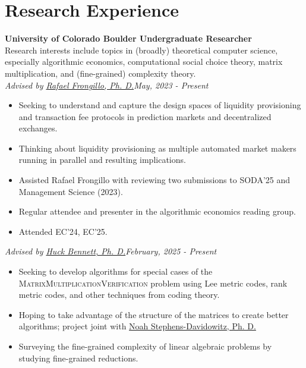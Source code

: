 \documentclass[a4paper,20pt]{article}
\begin{document}
    \vspace{-5pt}
    \section{Research Experience}
    \textbf{University of Colorado Boulder \hfill{Undergraduate Researcher}} \\
    Research interests include topics in (broadly) theoretical computer science, especially algorithmic economics, computational social choice theory, matrix multiplication, and (fine-grained) complexity theory.
    \\
    \emph{Advised by \href{https://raf.prof}{Rafael Frongillo, Ph. D.}}\hfill{\textit{May, 2023 - Present}}
    \\
    \begin{itemize}[label=-]
      \vspace{-5pt}
      \item Seeking to understand and capture the design spaces of liquidity provisioning and transaction fee protocols in prediction markets and decentralized exchanges.
      \vspace{-5pt}
      \item Thinking about liquidity provisioning as multiple automated market makers running in parallel and resulting implications.
      \vspace{-5pt}
      \item Assisted Rafael Frongillo with reviewing two submissions to SODA'25 and Management Science (2023).
      \vspace{-5pt}
      \item Regular attendee and presenter in the algorithmic economics reading group.
      \vspace{-5pt}
      \item Attended EC'24, EC'25.
   \end{itemize}
   \emph{Advised by \href{https://home.cs.colorado.edu/~hbennett/}{Huck Bennett, Ph. D.}}\hfill{\textit{February, 2025 - Present}}
   \\
    \begin{itemize}[label=-]
      \vspace{-5pt}
      \item Seeking to develop algorithms for special cases of the \textsc{MatrixMultiplicationVerification} problem using Lee metric codes, rank metric codes, and other techniques from coding theory. 
      \vspace{-5pt}
      \item Hoping to take advantage of the structure of the matrices to create better algorithms; project joint with \href{https://www.noahsd.com}{Noah Stephens-Davidowitz, Ph. D.} 
      \vspace{-5pt}
      \item Surveying the fine-grained complexity of linear algebraic problems by studying fine-grained reductions.
      \vspace{-5pt}
   \end{itemize} 
\end{document}
